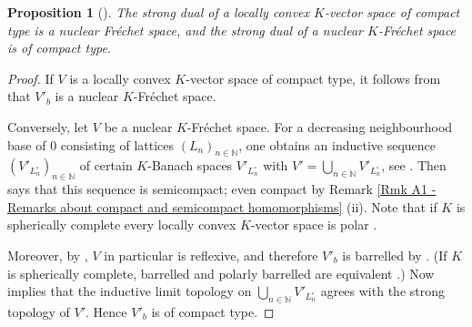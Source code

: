\documentclass[a4paper, reqno, 10pt]{amsart}
\newtheorem{proposition}[theorem]{Proposition}
\theoremstyle{definition}
\numberwithin{equation}{section}
\newcommand{\BN}{{\mathbb {N}}}
\begin{document}
\begin{proposition}[{\cite[Thm.\ 1.3]{SchneiderTeitelbaum02LocAnDistApplToGL2}}]\label{Prop A1 - Duality of spaces of compact type and nuclear Frechet spaces}
The strong dual of a locally convex $K$-vector space of compact type is a nuclear Fr\'echet space, and the strong dual of a nuclear $K$-Fr\'echet space is of compact type.
\end{proposition}
\begin{proof}
If $V$ is a locally convex $K$-vector space of compact type, it follows from \cite[Thm.\ 3.1.7 (vii),(viii)]{DeGrandeDeKimpeKakolPerezGarciaSchikofS97pAdicLocConvIndLim} that $V'_b$ is a nuclear $K$-Fr\'echet space.


Conversely, let $V$ be a nuclear $K$-Fr\'echet space.
For a decreasing neighbourhood base of $0$ consisting of lattices $(L_n)_{n\in \BN}$, one obtains an inductive sequence $(V'_{L_n^{\circ}})_{n\in \BN}$ of certain $K$-Banach spaces $V'_{L_n^{\circ}}$ with $V'= \bigcup_{n\in \BN} V'_{L_n^{\circ}}$, see \cite[Def.\ 2.5.2]{DeGrandeDeKimpeKakolPerezGarciaSchikofS97pAdicLocConvIndLim}.
Then \cite[Prop.\ 3.1.13]{DeGrandeDeKimpeKakolPerezGarciaSchikofS97pAdicLocConvIndLim} says that this sequence is semicompact; even compact by Remark \ref{Rmk A1 - Remarks about compact and semicompact homomorphisms} (ii).
Note that if $K$ is spherically complete every locally convex $K$-vector space is polar \cite[Thm.\ 4.4.3 (i)]{PerezGarciaSchikhof10LocConvSpNonArch}.


Moreover, by \cite[Cor.\ 8.5.3]{PerezGarciaSchikhof10LocConvSpNonArch}, $V$ in particular is reflexive, and therefore $V'_b$ is barrelled by \cite[Thm.\ 7.4.11 (i)]{PerezGarciaSchikhof10LocConvSpNonArch}.
(If $K$ is spherically complete, barrelled and polarly barrelled are equivalent \cite[Thm.\ 7.1.9 (ii)]{PerezGarciaSchikhof10LocConvSpNonArch}.)
Now \cite[Cor.\ 2.5.9]{DeGrandeDeKimpeKakolPerezGarciaSchikofS97pAdicLocConvIndLim} implies that the inductive limit topology on $\bigcup_{n\in \BN} V'_{L_n^{\circ}}$ agrees with the strong topology of $V'$.
Hence $V'_b$ is of compact type.
\end{proof}
\end{document}
